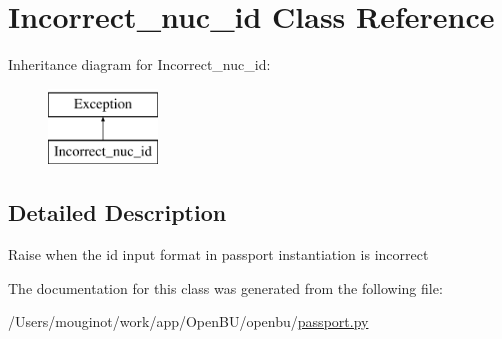 \hypertarget{classopenbu_1_1passport_1_1_incorrect__nuc__id}{}\section{Incorrect\+\_\+nuc\+\_\+id Class Reference}
\label{classopenbu_1_1passport_1_1_incorrect__nuc__id}
Inheritance diagram for Incorrect\+\_\+nuc\+\_\+id\+:\begin{figure}[H]
\begin{center}
\leavevmode
\includegraphics[height=2.000000cm]{classopenbu_1_1passport_1_1_incorrect__nuc__id}
\end{center}
\end{figure}


\subsection{Detailed Description}
\begin{DoxyVerb}Raise when the id input format in passport instantiation is incorrect\end{DoxyVerb}
 

The documentation for this class was generated from the following file\+:\begin{DoxyCompactItemize}
\item 
/\+Users/mouginot/work/app/\+Open\+B\+U/openbu/\mbox{\hyperlink{passport_8py}{passport.\+py}}\end{DoxyCompactItemize}
